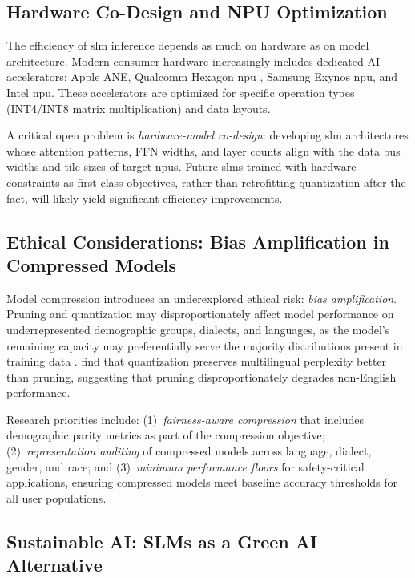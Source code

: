 \subsection{Hardware Co-Design and NPU Optimization}
\label{subsec:challenges_hardware}

The efficiency of \gls{slm} inference depends as much on hardware as on model architecture. Modern consumer hardware increasingly includes dedicated AI accelerators: Apple ANE, Qualcomm Hexagon \gls{npu} \citep{qualcomm2024ondevice}, Samsung Exynos \gls{npu}, and Intel \gls{npu}. These accelerators are optimized for specific operation types (INT4/INT8 matrix multiplication) and data layouts.

A critical open problem is \emph{hardware-model co-design}: developing \gls{slm} architectures whose attention patterns, FFN widths, and layer counts align with the data bus widths and tile sizes of target \glspl{npu}. Future \glspl{slm} trained with hardware constraints as first-class objectives, rather than retrofitting quantization after the fact, will likely yield significant efficiency improvements.

\subsection{Ethical Considerations: Bias Amplification in Compressed Models}
\label{subsec:challenges_ethics}

Model compression introduces an underexplored ethical risk: \emph{bias amplification}. Pruning and quantization may disproportionately affect model performance on underrepresented demographic groups, dialects, and languages, as the model's remaining capacity may preferentially serve the majority distributions present in training data \citep{blodgett2020language}. \citet{kurz2025pruning_vs_quant} find that quantization preserves multilingual perplexity better than pruning, suggesting that pruning disproportionately degrades non-English performance.

Research priorities include: (1)~\emph{fairness-aware compression} that includes demographic parity metrics as part of the compression objective; (2)~\emph{representation auditing} of compressed models across language, dialect, gender, and race; and (3)~\emph{minimum performance floors} for safety-critical applications, ensuring compressed models meet baseline accuracy thresholds for all user populations.

\subsection{Sustainable AI: SLMs as a Green AI Alternative}
\label{subsec:challenges_sustainability}

